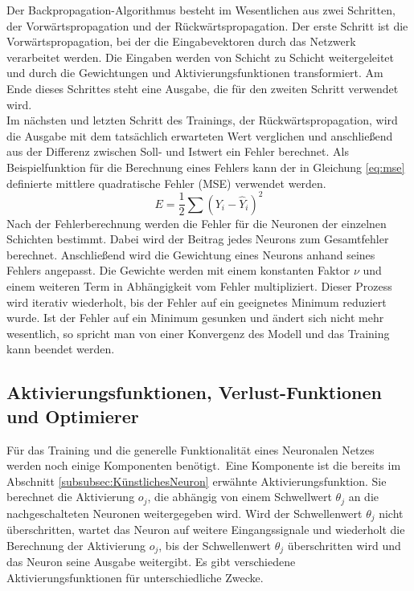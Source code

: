 Der Backpropagation-Algorithmus besteht im Wesentlichen aus zwei Schritten, der Vorwärtspropagation und der Rückwärtspropagation.
Der erste Schritt ist die Vorwärtspropagation, bei der die Eingabevektoren durch das Netzwerk verarbeitet werden. Die Eingaben werden von Schicht zu Schicht weitergeleitet und durch die Gewichtungen und Aktivierungsfunktionen transformiert. Am Ende dieses Schrittes steht eine Ausgabe, die für den zweiten Schritt verwendet wird. \\
Im nächsten und letzten Schritt des Trainings, der Rückwärtspropagation, wird die Ausgabe mit dem tatsächlich erwarteten Wert verglichen und anschließend aus der Differenz zwischen Soll- und Istwert ein Fehler berechnet. Als Beispielfunktion für die Berechnung eines Fehlers kann der in Gleichung \ref{eq:mse} definierte mittlere quadratische Fehler (MSE) verwendet werden.
\begin{equation}
	\label{eq:mse}
	E = \dfrac{1}{2} \sum (Y_i - \hat{Y}_{i})^2
\end{equation}
Nach der Fehlerberechnung werden die Fehler für die Neuronen der einzelnen Schichten bestimmt. Dabei wird der Beitrag jedes Neurons zum Gesamtfehler berechnet. Anschließend wird die Gewichtung eines Neurons anhand seines Fehlers angepasst. Die Gewichte werden mit einem konstanten Faktor $\nu$ und einem weiteren Term in Abhängigkeit vom Fehler multipliziert. Dieser Prozess wird iterativ wiederholt, bis der Fehler auf ein geeignetes Minimum reduziert wurde. Ist der Fehler auf ein Minimum gesunken und ändert sich nicht mehr wesentlich, so spricht man von einer Konvergenz des \gls{Modell} und das Training kann beendet werden.\cite[vgl.][]{Scherer1997}

\subsection{Aktivierungsfunktionen, Verlust-Funktionen und Optimierer}
\label{subsec:AktivierungsfunktionenVerlust-FunktionenOptimierer}
Für das Training und die generelle Funktionalität eines Neuronalen Netzes werden noch einige Komponenten benötigt.\
Eine Komponente ist die bereits im Abschnitt \ref{subsubsec:KünstlichesNeuron} erwähnte Aktivierungsfunktion. Sie berechnet die Aktivierung $o_j$, die abhängig von einem Schwellwert $\theta_j$ an die nachgeschalteten Neuronen weitergegeben wird. Wird der Schwellenwert $\theta_j$ nicht überschritten, wartet das Neuron auf weitere Eingangssignale und wiederholt die Berechnung der Aktivierung $o_j$, bis der Schwellenwert $\theta_j$ überschritten wird und das Neuron seine Ausgabe weitergibt. Es gibt verschiedene Aktivierungsfunktionen für unterschiedliche Zwecke.

